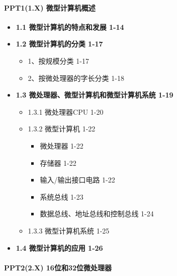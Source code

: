 \documentclass[zihao=5,linespread=1,heading=false,autoindent=0pt]{ctexart}
\newenvironment{citemize}%
{\begin{itemize}[parsep=0pt,itemsep=0pt,topsep=0pt,partopsep=0pt,labelwidth=1em,leftmargin=*]}
{\end{itemize}}
\theoremstyle{exampstyle} \newtheorem{definition}{定义}[section]
\theoremstyle{exampstyle} \newtheorem{example}{例}[section]
\theoremstyle{exampstyle} \newtheorem{theorem}{定理}[section]
\theoremstyle{exampstyle} \newtheorem{lemma}{引理}[section]
\theoremstyle{exampstyle} \newtheorem{myproof}{证明}[section]
\begin{document}
\begin{multicols*}{3}
\small
\paragraph{ PPT1(1.X) 微型计算机概述}
\begin{citemize}
     
    \item
      \textbf{1.1 微型计算机的特点和发展 1-14}
    \item
      \textbf{1.2 微型计算机的分类 1-17}
    
      \begin{citemize}
       
      \item
        1、按规模分类 1-17
      \item
        2、按微处理器的字长分类 1-18
      \end{citemize}
    \item
      \textbf{1.3 微处理器、微型计算机和微型计算机系统 1-19}
    
      \begin{citemize}
       
      \item
        1.3.1 微处理器CPU 1-20
      \item
        1.3.2 微型计算机 1-22
    
        \begin{citemize}
         
        \item
          微处理器 1-22
        \item
          存储器 1-22
        \item
          输入/输出接口电路 1-22
        \item
          系统总线 1-23
        \item
          数据总线、地址总线和控制总线 1-24
        \end{citemize}
      \item
        1.3.3 微型计算机系统 1-25
      \end{citemize}
    \item
      \textbf{1.4 微型计算机的应用 1-26}
    \end{citemize}
    
    \paragraph{PPT2(2.X)
    16位和32位微处理器}
    

\end{multicols*}
\end{document}
